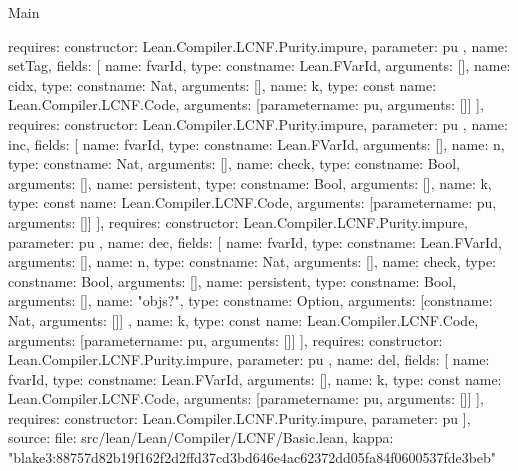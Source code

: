 \begin{lexlean}{Main}
\begin{toolingmodule}
{{{          requires: {constructor: Lean.Compiler.LCNF.Purity.impure, parameter: pu}
        },
        {
          name: setTag,
          fields: [
            {name: fvarId, type: const{name: Lean.FVarId, arguments: []}},
            {name: cidx, type: const{name: Nat, arguments: []}},
            {
              name: k,
              type: const{
                name: Lean.Compiler.LCNF.Code,
                arguments: [parameter{name: pu, arguments: []}]
              }
            }
          ],
          requires: {constructor: Lean.Compiler.LCNF.Purity.impure, parameter: pu}
        },
        {
          name: inc,
          fields: [
            {name: fvarId, type: const{name: Lean.FVarId, arguments: []}},
            {name: n, type: const{name: Nat, arguments: []}},
            {name: check, type: const{name: Bool, arguments: []}},
            {name: persistent, type: const{name: Bool, arguments: []}},
            {
              name: k,
              type: const{
                name: Lean.Compiler.LCNF.Code,
                arguments: [parameter{name: pu, arguments: []}]
              }
            }
          ],
          requires: {constructor: Lean.Compiler.LCNF.Purity.impure, parameter: pu}
        },
        {
          name: dec,
          fields: [
            {name: fvarId, type: const{name: Lean.FVarId, arguments: []}},
            {name: n, type: const{name: Nat, arguments: []}},
            {name: check, type: const{name: Bool, arguments: []}},
            {name: persistent, type: const{name: Bool, arguments: []}},
            {
              name: "objs?",
              type: const{name: Option, arguments: [const{name: Nat, arguments: []}]}
            },
            {
              name: k,
              type: const{
                name: Lean.Compiler.LCNF.Code,
                arguments: [parameter{name: pu, arguments: []}]
              }
            }
          ],
          requires: {constructor: Lean.Compiler.LCNF.Purity.impure, parameter: pu}
        },
        {
          name: del,
          fields: [
            {name: fvarId, type: const{name: Lean.FVarId, arguments: []}},
            {
              name: k,
              type: const{
                name: Lean.Compiler.LCNF.Code,
                arguments: [parameter{name: pu, arguments: []}]
              }
            }
          ],
          requires: {constructor: Lean.Compiler.LCNF.Purity.impure, parameter: pu}
        }
      ],
      source: {
        file: src/lean/Lean/Compiler/LCNF/Basic.lean,
        kappa: "blake3:88757d82b19f162f2d2ffd37cd3bd646e4ac62372dd05fa84f0600537fde3beb"
}}}
\end{toolingmodule}
\end{lexlean}
